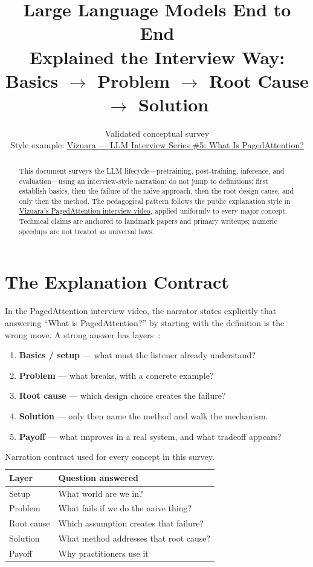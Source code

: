 \documentclass[11pt,a4paper]{article}
\title{Large Language Models End to End\\
\large Explained the Interview Way:\\
Basics $\rightarrow$ Problem $\rightarrow$ Root Cause $\rightarrow$ Solution}
\author{Validated conceptual survey\\[0.5em]
Style example:
\href{https://www.youtube.com/watch?v=-AB6m0Spo6c}{Vizuara --- LLM Interview Series \#5: What Is PagedAttention?}}
\date{}
\begin{document}
\maketitle

\begin{abstract}
This document surveys the LLM lifecycle---pretraining, post-training, inference, and evaluation---using an interview-style narration:
do not jump to definitions; first establish basics, then the failure of the naive approach, then the root design cause, and only then the method.
The pedagogical pattern follows the public explanation style in
\href{https://www.youtube.com/watch?v=-AB6m0Spo6c}{Vizuara's PagedAttention interview video},
applied uniformly to every major concept.
Technical claims are anchored to landmark papers and primary writeups; numeric speedups are not treated as universal laws.
\end{abstract}

\tableofcontents
\clearpage

\section{The Explanation Contract}
\label{sec:contract}

In the PagedAttention interview video, the narrator states explicitly that answering ``What is PagedAttention?'' by starting with the definition is the wrong move.
A strong answer has layers~\cite{vizuara2026paged}:

\begin{enumerate}[leftmargin=*]
  \item \textbf{Basics / setup} --- what must the listener already understand?
  \item \textbf{Problem} --- what breaks, with a concrete example?
  \item \textbf{Root cause} --- which design choice creates the failure?
  \item \textbf{Solution} --- only then name the method and walk the mechanism.
  \item \textbf{Payoff} --- what improves in a real system, and what tradeoff appears?
\end{enumerate}

\begin{table}[ht]
\centering
\small
\begin{tabularx}{\textwidth}{@{}lY@{}}
\toprule
\textbf{Layer} & \textbf{Question answered} \\
\midrule
Setup & What world are we in? \\
Problem & What fails if we do the naive thing? \\
Root cause & Which assumption creates that failure? \\
Solution & What method addresses that root cause? \\
Payoff & Why practitioners use it \\
\bottomrule
\end{tabularx}
\caption{Narration contract used for every concept in this survey.}
\label{tab:contract}
\end{table}
\end{document}
